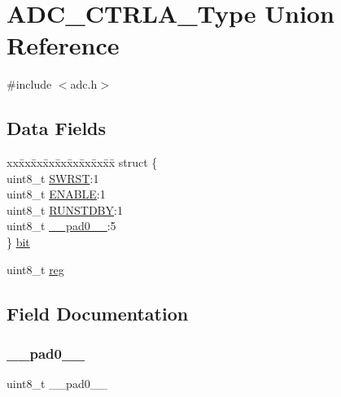 \hypertarget{union_a_d_c___c_t_r_l_a___type}{}\section{A\+D\+C\+\_\+\+C\+T\+R\+L\+A\+\_\+\+Type Union Reference}
\label{union_a_d_c___c_t_r_l_a___type}


{\ttfamily \#include $<$adc.\+h$>$}

\subsection*{Data Fields}
\begin{DoxyCompactItemize}
\item 
\begin{tabbing}
xx\=xx\=xx\=xx\=xx\=xx\=xx\=xx\=xx\=\kill
struct \{\\
\>uint8\_t \mbox{\hyperlink{union_a_d_c___c_t_r_l_a___type_a9334d5ac0548802c90a8129c52c8e490}{SWRST}}:1\\
\>uint8\_t \mbox{\hyperlink{union_a_d_c___c_t_r_l_a___type_a2b3662f1b123463ae1a23c1f324e5cc5}{ENABLE}}:1\\
\>uint8\_t \mbox{\hyperlink{union_a_d_c___c_t_r_l_a___type_aa24338c5cacc63e3b77adf2dc0938ff6}{RUNSTDBY}}:1\\
\>uint8\_t \mbox{\hyperlink{union_a_d_c___c_t_r_l_a___type_a8b4eebe79ded0459acec2f4950102ba3}{\_\_pad0\_\_}}:5\\
\} \mbox{\hyperlink{union_a_d_c___c_t_r_l_a___type_a974213afa070a0905d94d04b172b6054}{bit}}\\

\end{tabbing}\item 
uint8\+\_\+t \mbox{\hyperlink{union_a_d_c___c_t_r_l_a___type_a9428adc9af4653a2050e2536b55dec8d}{reg}}
\end{DoxyCompactItemize}


\subsection{Field Documentation}
\mbox{\label{union_a_d_c___c_t_r_l_a___type_a8b4eebe79ded0459acec2f4950102ba3}} 
\subsubsection{\texorpdfstring{\_\_pad0\_\_}{\_\_pad0\_\_}}
{\footnotesize\ttfamily uint8\+\_\+t \+\_\+\+\_\+pad0\+\_\+\+\_\+}


